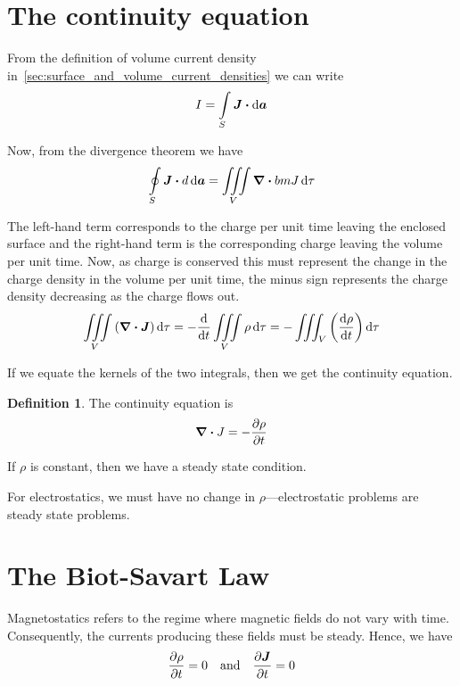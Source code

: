 \documentclass[12pt,chapterprefix=false,dvipsnames]{scrbook}
\theoremstyle{dotless}
\theoremstyle{definition}
\newtheorem{protodefinition}{Definition}[section]
\newenvironment{definition}
{\colorlet{shadecolor}{black!15}\begin{shaded}\begin{protodefinition}}
			{\end{protodefinition}\end{shaded}}
\begin{document}
\section{The continuity equation}%
\label{sec:the_continuity_equation}

From the definition of volume current density
in~\ref{sec:surface_and_volume_current_densities} we can write
\begin{equation}
	I = \int\limits_{S}\bm{J}\vdot
	\dd{\bm{a}}
\end{equation}

Now, from the divergence theorem we have
\begin{equation}
	\oint\limits_{S}\bm{J}\vdot
	d\dd{\bm{a}} =
	\iiint\limits_{V}\divergence{bm{J}}\dd{\tau}
\end{equation}

The left-hand term corresponds to the charge per unit time
leaving the enclosed surface and the right-hand term is the
corresponding charge leaving the volume per unit time. Now, as
charge is conserved this must represent the change in the charge
density in the volume per unit time, the minus sign represents
the charge density decreasing as the charge flows out.
\begin{equation}
	\iiint\limits_V\left(\divergence{\bm{J}}\right)\dd{\tau}
	=
	-\dv{}{t}\iiint\limits_V\rho
	\dd{\tau}
	=
	-\iiint_V \left(\dv{\rho}{t}\right)\dd{\tau}
\end{equation}

If we equate the kernels of the two integrals, then we get the
continuity equation.
\begin{definition}
	The continuity equation is
	\begin{equation}
		\divergence{J} = -\pdv{\rho}{t}
	\end{equation}

	If $\rho$ is constant, then we have a steady
	state condition.
\end{definition}

For electrostatics, we must have no change in
$\rho$---electrostatic problems are steady
state problems.

\section{The Biot-Savart Law}%
\label{sec:the_biot_savart_law}

Magnetostatics refers to the regime where magnetic fields do not
vary with time. Consequently, the currents producing these
fields must be steady. Hence, we have
\begin{equation}
	\pdv{\rho}{t} = 0\hspace{1em}
	\mathrm{and}\hspace{1em}\pdv{\bm{J}}{t}
	= 0
\end{equation}
\end{document}
